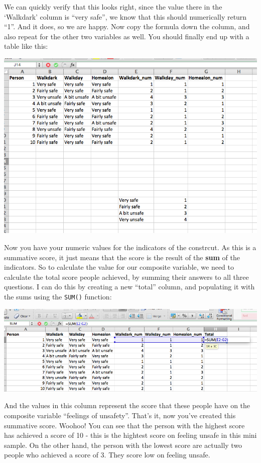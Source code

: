 \documentclass[]{book}
\theoremstyle{definition}
\theoremstyle{definition}
\theoremstyle{definition}
\theoremstyle{remark}
\begin{document}
We can quickly verify that this looks right, since the value there in
the `Walkdark' column is ``very safe'', we know that this should
numerically return ``1''. And it does, so we are happy. Now copy the
formula down the column, and also repeat for the other two variables as
well. You should finally end up with a table like this:

\includegraphics{imgs/final_lookup.png}

Now you have your numeric values for the indicators of the constrcut. As
this is a summative score, it just means that the score is the result of
the \textbf{sum} of the indicators. So to calculate the value for our
composite variable, we need to calculate the total score people
achieved, by summing their answers to all three questions. I can do this
by creating a new ``total'' column, and populating it with the sums
using the \texttt{SUM()} function:

\includegraphics{imgs/tot_sum_alpha.png}

And the values in this column represent the score that these people have
on the composite variable ``feelings of unsafety''. That's it, now
you've created this summative score. Woohoo! You can see that the person
with the highest score has achieved a score of 10 - this is the hightest
score on feeling unsafe in this mini sample. On the other hand, the
person with the lowest score are actually two people who achieved a
score of 3. They score low on feeling unsafe.
\end{document}
